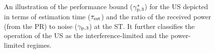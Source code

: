\begin{figure}[!ht]

\caption{
An illustration of the performance bound (${\gamma}_{\text{p,3}}^*$) for the US depicted in terms of estimation time ($\tau_{\text{est}}$) and the ratio of the received power (from the PR) to noise (${\gamma}_{\text{p,3}}$) at the ST. It further classifies the operation of the US as the interference-limited and the power-limited regimes.}
\label{fig_US:or}
\end{figure}
